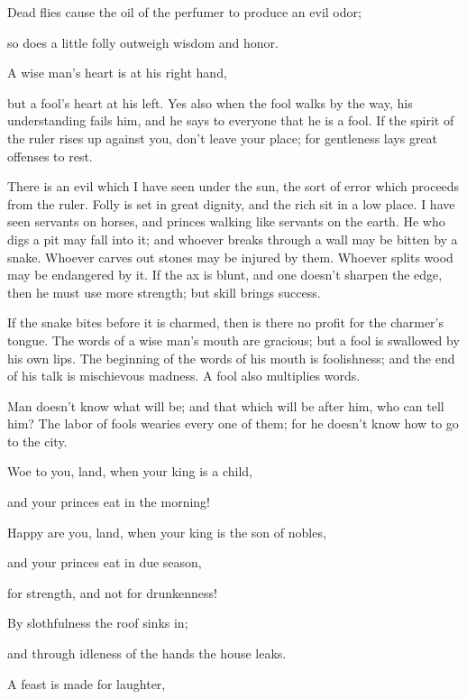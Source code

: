 \mychapter{} \myverse*{}Dead flies cause the oil of the perfumer to produce an evil odor;

\quad\quad so does a little folly outweigh wisdom and honor.

\myverse{}A wise man’s heart is at his right hand,

but a fool’s heart at his left.
\myverse{}Yes also when the fool walks by the way, his understanding fails him, and he
says to everyone that he is a fool.
\myverse{}If the spirit of the ruler rises up against you, don’t leave your place; for
gentleness lays great offenses to rest.

\myverse{}There is an evil which I have seen under the sun, the sort of
error which proceeds from the ruler.
\myverse{}Folly is set in great dignity, and the rich sit in a low place.
\myverse{}I have seen servants on horses, and princes walking like servants on the earth.
\myverse{}He who digs a pit may fall into it; and whoever breaks through a wall may be
bitten by a snake.
\myverse{}Whoever carves out stones may be injured by them. Whoever splits wood may be
endangered by it.
\myverse{}If the ax is blunt, and one doesn’t sharpen the edge, then he must use more
strength; but skill brings success.

\myverse{}If the snake bites before it is charmed, then is there no profit
for the charmer’s tongue.
\myverse{}The words of a wise man’s mouth are gracious; but a fool is swallowed by
his own lips.
\myverse{}The beginning of the words of his mouth is foolishness; and the end of his
talk is mischievous madness.
\myverse{}A fool also multiplies words.

Man doesn’t know what will be; and that which will be after him, who can tell him?
\myverse{}The labor of fools wearies every one of them; for he doesn’t know how to
go to the city.

\myverse{}Woe to you, land, when your king is a child,

and your princes eat in the morning!

\myverse{}Happy are you, land, when your king is the son of nobles,

and your princes eat in due season,

for strength, and not for drunkenness!

\myverse{}By slothfulness the roof sinks in;

and through idleness of the hands the house leaks.

\myverse{}A feast is made for laughter,

